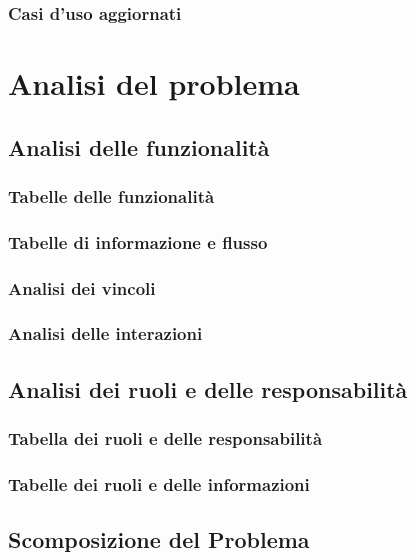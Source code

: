 \documentclass{article}
\begin{document}
\subsubsection{\Large Casi d'uso aggiornati}



\pagebreak
\section{\Large Analisi del problema}
\subsection{\Large Analisi delle funzionalità}
\subsubsection{\Large Tabelle delle funzionalità}

\subsubsection{\Large Tabelle di informazione e flusso}

\subsubsection{\Large Analisi dei vincoli}

\pagebreak
\subsubsection{\Large Analisi delle interazioni}


\subsection{\Large Analisi dei ruoli e delle responsabilità}
\subsubsection{\Large Tabella dei ruoli e delle responsabilità}

\subsubsection{\Large Tabelle dei ruoli e delle informazioni}

\pagebreak
\subsection{\Large Scomposizione del Problema}





\pagebreak

\end{document}

